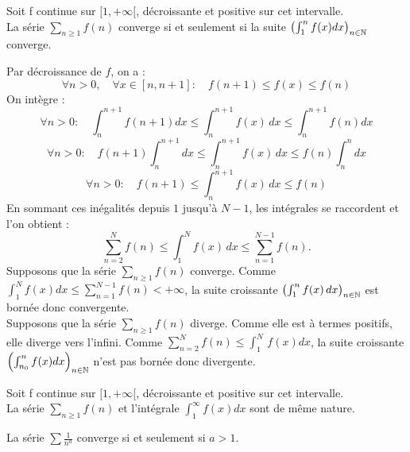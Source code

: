 \documentclass{book}
\begin{document}
\begin{Theoreme}
Soit f continue sur $[1,+\infty[$, décroissante
et positive sur cet intervalle. \\
La série $\sum_{n\geq 1} f(n)$ converge si et seulement si la suite $\left( \int_{1}^n f(x) dx \right)_{n\in\mathbb{N}}$ converge.
\end{Theoreme}
\begin{Demonstration}
Par décroissance de $f$, on a :
$$\forall n> 0,\quad \forall x\in [n,n+1]:\quad f(n+1)\leq f(x) \leq f(n)$$
On intègre : 
$$\forall n> 0 : \quad \int_n^{n+1}f(n+1)dx\leq \int_n^{n+1}f(x)\,dx \leq \int_n^{n+1}f(n)dx$$
$$\forall n>0 : \quad f(n+1)\int_n^{n+1}dx\leq \int_n^{n+1}f(x)\,dx \leq f(n)\int_n^{n}dx$$
$$\forall n> 0 : \quad f(n+1)\leq \int_n^{n+1}f(x)\,dx \leq f(n)$$
En sommant ces inégalités depuis $1$ jusqu'à $N-1$, les intégrales se raccordent et l'on obtient : 
 $$\sum_{n=2}^{N}f(n)\leq \int_1^N f(x)\,dx \leq \sum_{n=1}^{N-1}f(n).$$
Supposons que la série $\sum_{n\geq 1} f(n)$ converge. Comme $\int_1^N f(x)dx \leq \sum_{n=1}^{N-1}f(n)<+\infty$, la suite croissante $\left( \int_{1}^n f(x)\, dx \right)_{n\in\mathbb{N}}$ est  bornée donc convergente. \\
Supposons que la série $\sum_{n\geq 1}f(n)$ diverge. Comme elle est à termes positifs, elle diverge vers l'infini.  Comme $\sum_{n=2}^{N}f(n)\leq \int_1^N\, f(x)dx$, la suite croissante $\left( \int_{n_0}^n f(x) dx \right)_{n\in\mathbb{N}}$ n'est pas bornée donc divergente. 
\end{Demonstration}
\begin{Theoreme}
Soit f continue sur $[1,+\infty[$, décroissante
et positive sur cet intervalle. \\
La série $\sum_{n\geq 1} f(n)$ et l'intégrale $\int_{1}^\infty f(x) dx$ sont de même nature.
\end{Theoreme}
\begin{Proposition}
La série $\sum \frac{1}{n^a}$ converge si et seulement si $a> 1$.
\end{Proposition}
\end{document}
